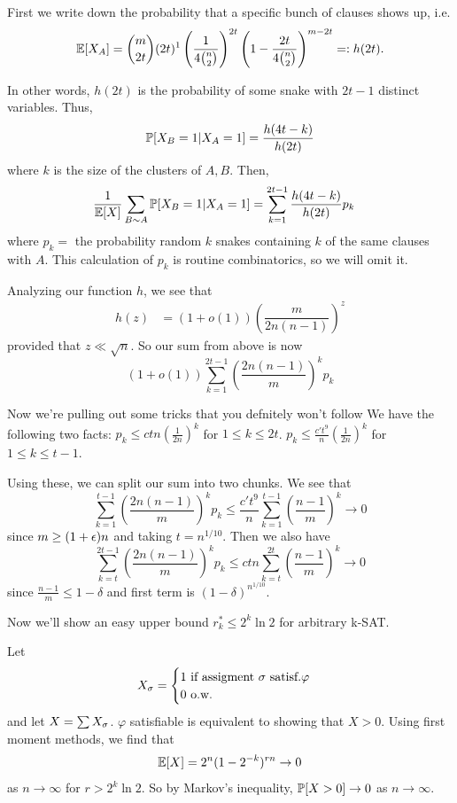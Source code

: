 \documentclass[11 pt]{scrartcl}
\newcommand{\satisf}{\text{ satisf.}}
\begin{document}
    First we write down the probability that a specific bunch of clauses shows up, i.e. 
    \[ \mathbb E[X_A] = \dbinom{m}{2t} (2t)^1 \left(\dfrac{1}{4\binom{n}{2}}\right)^{2t} \left(1 - \dfrac{2t}{4\binom{n}{2}}\right)^{m-2t} =: h(2t).\] 
    
    In other words, $h(2t)$ is the probability of some snake with $2t-1$ distinct variables. Thus, 
    \[ \mathbb P[X_B = 1 | X_A = 1] = \dfrac{h(4t-k)}{h(2t)}\] 
    where $k$ is the size of the clusters of $A,B$. Then, 
    \begin{align*}
        \dfrac{1}{\mathbb E[X]} \sum_{B\sim A} \mathbb P[X_B = 1| X_A = 1] &= \sum_{k=1}^{2t-1} \dfrac{h(4t-k)}{h(2t)}  p_k
    \end{align*}
    where $p_k = $ the probability random $k$ snakes containing $k$ of the same clauses with $A$. This calculation of $p_k$ is routine combinatorics, so we will omit it. 

    Analyzing our function $h$, we see that 
    \begin{align*}
        h(z) &= (1 + o(1)) \left(\dfrac{m}{2n(n-1)}\right)^z
    \end{align*}
    provided that $z \ll \sqrt{n}$. So our sum from above is now 
    \[ (1 + o(1)) \sum_{k=1}^{2t-1} \left(\dfrac{2n(n-1)}{m}\right)^k p_k\] 

    Now we're pulling out some tricks that you defnitely won't follow We have the following two facts: 
    \alphanum
        \ii $p_k \leq ctn\left(\frac{1}{2n}\right)^k$ for $1 \leq k \leq 2t$.
        \ii $p_k \leq \frac{c' t^9}{n} \left(\frac{1}{2n}\right)^k$ for $1 \leq k \leq t-1$. 
    \enumend

    Using these, we can split our sum into two chunks. We see that 
    \[ \sum_{k=1}^{t-1} \left(\dfrac{2n(n-1)}{m}\right)^k p_k \leq \dfrac{c' t^9}{n} \sum_{k=1}^{t-1} \left(\dfrac{n-1}{m}\right)^k \to 0 \]
    since $m \geq (1+\epsilon)n$ and taking $t = n^{1/10}$. Then we also have 
    \[ \sum_{k=t}^{2t-1} \left(\dfrac{2n(n-1)}{m}\right)^k p_k \leq ctn \sum_{k=t}^{2t} \left(\dfrac{n-1}{m}\right)^k \to 0 \]
        since $\frac{n-1}{m} \leq 1-\delta$ and first term is $(1-\delta)^{n^{1/10}}$. 


    Now we'll show an easy upper bound $r_k^* \leq 2^k \ln 2$ for arbitrary k-SAT. 

    Let 
    \[ X_\si = \begin{cases} 1 \text{ if assigment }\si\satisf\varphi \\ 0 \text{ o.w. } \end{cases}\] 
    and let $X = \sum X_\sigma$. $\varphi$ satisfiable is equivalent to showing that $X > 0$. 
    Using first moment methods, we find that 
    \[ \mathbb E[X] = 2^n (1-2^{-k})^{rn} \to 0\] 
    as $n \to \infty$ for $ r > 2^k \ln 2$. So by Markov's inequality, $\mathbb P[X > 0] \to 0$ as $n\to \infty$.
\end{document}
